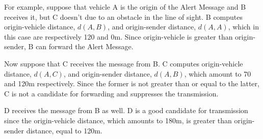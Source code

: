 		
		
		For example, suppose that vehicle A is the origin of the Alert Message and B receives it, but C doesn't due to an obstacle in the line of sight. B computes origin-vehicle distance, $d(A, B)$, and origin-sender distance, $d(A, A)$, which in this case are respectively 120 and 0m. Since origin-vehicle is greater than origin-sender, B can forward the Alert Message.
		
		
		Now suppose that C receives the message from B. C computes origin-vehicle distance, $d(A, C)$, and origin-sender distance, $d(A, B)$, which amount to 70 and 120m respectively. Since the former is not greater than or equal to the latter, C is not a candidate for forwarding and suppresses the transmission.
		
		
		D receives the message from B as well. D is a good candidate for transmission since the origin-vehicle distance, which amounts to 180m, is greater than origin-sender distance, equal to 120m.
